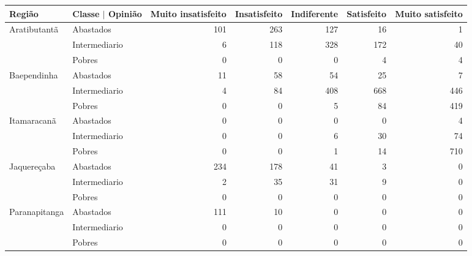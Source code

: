 \begin{table}[ht]
\scriptsize
\centering{}
\label{tabela:q16b}
\begin{tabular}{ll rrrrr}
  \toprule
 Região        & Classe $\vert$ Opinião & \multicolumn{1}{l}{ Muito insatisfeito} & \multicolumn{1}{l}{ Insatisfeito} & \multicolumn{1}{l}{ Indiferente} & \multicolumn{1}{l}{ Satisfeito} & \multicolumn{1}{l}{ Muito satisfeito} \\ 
   \midrule
Aratibutantã  & Abastados               &                101 &          263 &         127 &         16 &                1 \\ 
                & Intermediario           &                  6 &          118 &         328 &        172 &               40 \\ 
                & Pobres                  &                  0 &            0 &           0 &          4 &                4 \\ 
  Baependinha   & Abastados               &                 11 &           58 &          54 &         25 &                7 \\ 
                & Intermediario           &                  4 &           84 &         408 &        668 &              446 \\ 
                & Pobres                  &                  0 &            0 &           5 &         84 &              419 \\ 
  Itamaracanã   & Abastados               &                  0 &            0 &           0 &          0 &                4 \\ 
                & Intermediario           &                  0 &            0 &           6 &         30 &               74 \\ 
                & Pobres                  &                  0 &            0 &           1 &         14 &              710 \\ 
  Jaquereçaba   & Abastados               &                234 &          178 &          41 &          3 &                0 \\ 
                & Intermediario           &                  2 &           35 &          31 &          9 &                0 \\ 
                & Pobres                  &                  0 &            0 &           0 &          0 &                0 \\ 
  Paranapitanga & Abastados               &                111 &           10 &           0 &          0 &                0 \\ 
                & Intermediario           &                  0 &            0 &           0 &          0 &                0 \\ 
                & Pobres                  &                  0 &            0 &           0 &          0 &                0 \\ 
   \bottomrule
\end{tabular}
\end{table}

